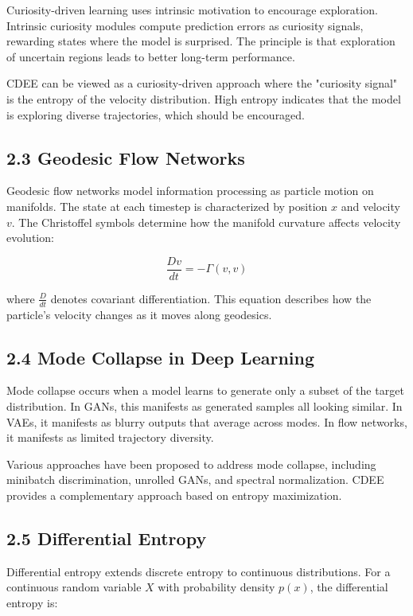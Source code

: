 \documentclass[12pt]{article}
\begin{document}
Curiosity-driven learning uses intrinsic motivation to encourage exploration. Intrinsic curiosity modules compute prediction errors as curiosity signals, rewarding states where the model is surprised. The principle is that exploration of uncertain regions leads to better long-term performance.

CDEE can be viewed as a curiosity-driven approach where the "curiosity signal" is the entropy of the velocity distribution. High entropy indicates that the model is exploring diverse trajectories, which should be encouraged.

\subsection{2.3 Geodesic Flow Networks}

Geodesic flow networks model information processing as particle motion on manifolds. The state at each timestep is characterized by position $x$ and velocity $v$. The Christoffel symbols determine how the manifold curvature affects velocity evolution:

\begin{equation}
\frac{Dv}{dt} = -\Gamma(v, v)
\end{equation}

where $\frac{D}{dt}$ denotes covariant differentiation. This equation describes how the particle's velocity changes as it moves along geodesics.

\subsection{2.4 Mode Collapse in Deep Learning}

Mode collapse occurs when a model learns to generate only a subset of the target distribution. In GANs, this manifests as generated samples all looking similar. In VAEs, it manifests as blurry outputs that average across modes. In flow networks, it manifests as limited trajectory diversity.

Various approaches have been proposed to address mode collapse, including minibatch discrimination, unrolled GANs, and spectral normalization. CDEE provides a complementary approach based on entropy maximization.

\subsection{2.5 Differential Entropy}

Differential entropy extends discrete entropy to continuous distributions. For a continuous random variable $X$ with probability density $p(x)$, the differential entropy is:
\end{document}
